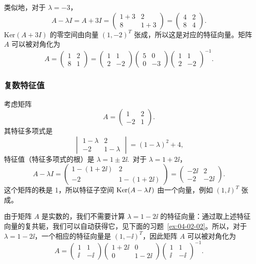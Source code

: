 类似地，对于 $\lambda = -3$，
$$A - \lambda I = A + 3I = \begin{pmatrix} 1+3 & 2 \\ 8 & 1+3 \end{pmatrix} = \begin{pmatrix} 4 & 2 \\ 8 & 4 \end{pmatrix}.$$
Ker$(A + 3I)$ 的零空间由向量 $(1, -2)^T$ 张成，所以这是对应的特征向量。矩阵 $A$ 可以被对角化为
$$A =\begin{pmatrix} 1 & 2 \\ 8 & 1 \end{pmatrix}= \begin{pmatrix} 1 & 1 \\ 2 & -2 \end{pmatrix} \begin{pmatrix} 5 & 0 \\ 0 & -3 \end{pmatrix} \begin{pmatrix} 1 & 1 \\ 2 & -2 \end{pmatrix}^{-1}.$$

\subsubsection{复数特征值}\label{sec:04-02-07-02}

考虑矩阵
$$A = \begin{pmatrix} 1 & 2 \\ -2 & 1 \end{pmatrix}.$$
其特征多项式是
$$\begin{vmatrix} 1-\lambda & 2 \\ -2 & 1-\lambda \end{vmatrix} = (1-\lambda)^2 + 4,$$
特征值（特征多项式的根）是 $\lambda = 1 \pm 2\ii$.~对于 $\lambda = 1 + 2\ii$，
$$A - \lambda I = \begin{pmatrix} 1-(1+2\ii) & 2 \\ -2 & 1-(1+2\ii) \end{pmatrix} = \begin{pmatrix} -2\ii & 2 \\ -2 & -2\ii \end{pmatrix}.$$
这个矩阵的秩是 1，所以特征子空间 $\operatorname{Ker}(A - \lambda I)$ 由一个向量，例如 $(1, \ii)^T$ 张成。

由于矩阵 $A$ 是实数的，我们不需要计算 $\lambda = 1 - 2\ii$ 的特征向量：通过取上述特征向量的复共轭，我们可以自动获得它，见下面的习题~\ref{ex:04-02-02}。所以，对于 $\lambda = 1 - 2\ii$，一个相应的特征向量是 $(1, -\ii)^T$，因此矩阵 $A$ 可以被对角化为
$$A = \begin{pmatrix} 1 & 1 \\ \ii & -\ii \end{pmatrix} \begin{pmatrix} 1+2\ii & 0 \\ 0 & 1-2\ii \end{pmatrix} \begin{pmatrix} 1 & 1 \\ \ii & -\ii \end{pmatrix}^{-1}.$$


